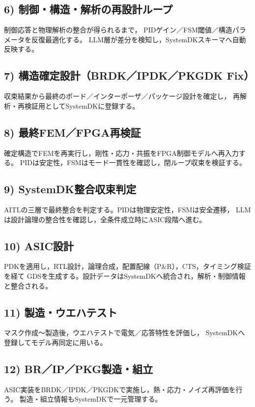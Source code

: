 \subsection{6) 制御・構造・解析の再設計ループ}
制御応答と物理解析の整合が得られるまで，
PIDゲイン／FSM閾値／構造パラメータを反復最適化する。
LLM層が差分を検知し，SystemDKスキーマへ自動反映する。

\subsection{7) 構造確定設計（BRDK／IPDK／PKGDK Fix）}
収束結果から最終のボード／インターポーザ／パッケージ設計を確定し，
再解析・再検証用としてSystemDKに登録する。

\subsection{8) 最終FEM／FPGA再検証}
確定構造でFEMを再実行し，剛性・応力・共振をFPGA制御モデルへ再入力する。
PIDは安定性，FSMはモード一貫性を確認し，閉ループ収束を検証する。

\subsection{9) SystemDK整合収束判定}
AITLの三層で最終整合を判定する。PIDは物理安定性，FSMは安全遷移，
LLMは設計論理の整合性を確認し，全条件成立時にASIC段階へ進む。

\subsection{10) ASIC設計}
PDKを適用し，RTL設計，論理合成，配置配線（P\&R），CTS，タイミング検証を経て
GDSを生成する。設計データはSystemDKへ統合され，解析・制御情報と整合される。

\subsection{11) 製造・ウエハテスト}
マスク作成～製造後，ウエハテストで電気／応答特性を評価し，
SystemDKへ登録してモデル再同定に用いる。

\subsection{12) BR／IP／PKG製造・組立}
ASIC実装をBRDK／IPDK／PKGDKで実施し，熱・応力・ノイズ再評価を行う。
製造・組立情報もSystemDKで一元管理する。

